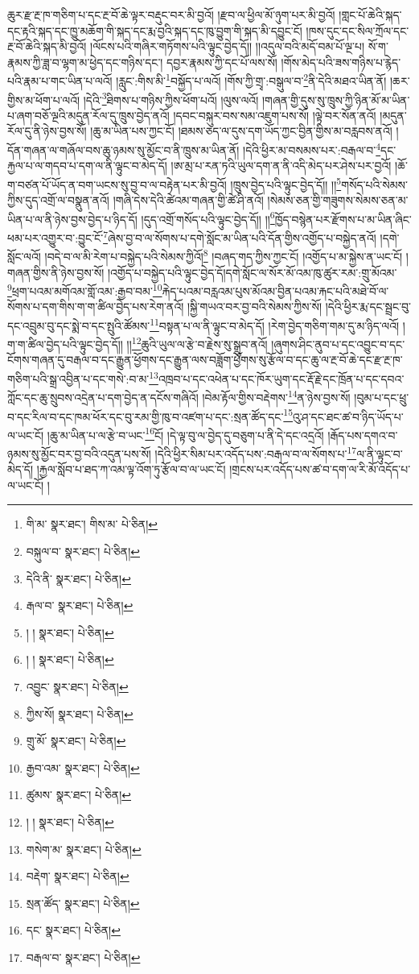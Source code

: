 ཆུར་རྫ་རྔ་ཁ་གཅིག་པ་དང་རྔ་བོ་ཆེ་ལྟར་བརྡུང་བར་མི་བྱའོ། །རྫབ་ལ་ཕྱིལ་མོ་ཉུག་པར་མི་བྱའོ། །གླང་པོ་ཆེའི་སྐད་དང་རྟའི་སྐད་དང་ཁྱུ་མཆོག་གི་སྐད་དང་རྨ་བྱའི་སྐད་དང་ཁུ་བྱུག་གི་སྐད་མི་དབྱུང་ངོ། །ཁས་དུང་དང་སིལ་ཀྲོལ་དང་རྔ་བོ་ཆེའི་སྐད་མི་བྱའོ། །ལོངས་པའི་གཞིར་གཏོགས་པའི་ལྟུང་བྱེད་དོ།། །།འདུལ་བའི་མདོ་བམ་པོ་ལྔ་པ། སོ་ག་རྣམས་ཀྱི་ཟླ་བ་ལྷག་མ་ཕྱེད་དང་གཉིས་དང་། དབྱར་རྣམས་ཀྱི་དང་པོ་ལས་སོ། །གོས་མེད་པའི་ཟས་གཉིས་པ་རྙེད་པའི་རྣམ་པ་གང་ཡིན་པ་ལའོ། །རླུང་:གིས་མི་\footnote{གི་མ་  སྣར་ཐང་། གིས་མ་  པེ་ཅིན། }བསྐྱོད་པ་ལའོ། །གོས་ཀྱི་གྲྭ་:བསྒུལ་བ་\footnote{བསྐུལ་བ་  སྣར་ཐང་།  པེ་ཅིན། }ནི་དེའི་མཐའ་ཡིན་ནོ། །ཆར་གྱིས་མ་ཕོག་པ་ལའོ། །དེའི་\footnote{དེའི་ནི་  སྣར་ཐང་།  པེ་ཅིན། }ཐིགས་པ་གཉིས་ཀྱིས་ཕོག་པའོ། །ལུས་ལའོ། །གཞན་གྱི་དུས་སུ་ཁྲུས་ཀྱི་ཉིན་མོ་མ་ཡིན་པ་ཞག་བཅོ་ལྔའི་མདུན་རོལ་དུ་ཁྲུས་བྱེད་ནའོ། །དབང་བསྐུར་བས་སམ་འཇུག་པས་སོ། །ལྟེ་བར་སོན་ནའོ། །མདུན་རོལ་དུ་ནི་ཉེས་བྱས་སོ། །ཆུ་མ་ཡིན་པས་ཀྱང་ངོ། །ཐམས་ཅད་ལ་དུས་དག་ཡོད་ཀྱང་བྱིན་གྱིས་མ་བརླབས་ནའོ། །དོན་གཞན་ལ་གཞོལ་བས་ཆུ་ཉམས་སུ་མྱོང་བ་ནི་ཁྲུས་མ་ཡིན་ནོ། །དེའི་ཕྱིར་མ་བསམས་པར་:བརྒལ་བ་\footnote{རྒལ་བ་  སྣར་ཐང་།  པེ་ཅིན། }དང་རྐྱལ་པ་ལ་གདབ་པ་དག་ལ་ནི་ལྟུང་བ་མེད་དོ། །ཨ་མྲ་པ་རན་ཏའི་ཡུལ་དག་ན་ནི་འདི་མེད་པར་ཤེས་པར་བྱའོ། །ཆོ་ག་བཙན་པོ་ཡོད་ན་བག་ཡངས་སུ་བྱ་བ་ལ་བརྟེན་པར་མི་བྱའོ། །ཁྲུས་བྱེད་པའི་ལྟུང་བྱེད་དོ།། །།\footnote{། །  སྣར་ཐང་།  པེ་ཅིན། }གསོད་པའི་སེམས་ཀྱིས་དུད་འགྲོ་ལ་བསྣུན་ནའོ། །གཞི་དེས་དེའི་ཚེའམ་གཞན་གྱི་ཚེ་ཤི་ནའོ། །སེམས་ཅན་གྱི་གཟུགས་སེམས་ཅན་མ་ཡིན་པ་ལ་ནི་ཉེས་བྱས་བྱེད་པ་ཉིད་དོ། །དུད་འགྲོ་གསོད་པའི་ལྟུང་བྱེད་དོ།། །།\footnote{། །  སྣར་ཐང་།  པེ་ཅིན། }ཁྱོད་བསྙེན་པར་རྫོགས་པ་མ་ཡིན་ཞིང་ཕམ་པར་འགྱུར་བ་:བྱུང་ངོ་\footnote{འབྱུང་  སྣར་ཐང་།  པེ་ཅིན། }ཞེས་བྱ་བ་ལ་སོགས་པ་དགེ་སློང་མ་ཡིན་པའི་དོན་གྱིས་འགྱོད་པ་བསྐྱེད་ནའོ། །དགེ་སློང་ལའོ། །བདེ་བ་ལ་མི་རེག་པ་བསྐྱེད་པའི་སེམས་ཀྱིའོ།\footnote{ཀྱིས་སོ།  སྣར་ཐང་།  པེ་ཅིན། } །བཞད་གད་ཀྱིས་ཀྱང་ངོ། །འགྱོད་པ་མ་སྐྱེས་ན་ཡང་ངོ། །གཞན་གྱིས་ནི་ཉེས་བྱས་སོ། །འགྱོད་པ་བསྐྱེད་པའི་ལྟུང་བྱེད་དོ།དགེ་སློང་ལ་སོར་མོ་འམ་ཁུ་ཚུར་རམ་:གྲུ་མོའམ་\footnote{གྲུ་མོ་  སྣར་ཐང་།  པེ་ཅིན། }ཕྲག་པའམ་མགོའམ་གློ་འམ་:རྒྱབ་བམ་\footnote{རྒྱབ་འམ་  སྣར་ཐང་།  པེ་ཅིན། }རྐེད་པའམ་བརླའམ་པུས་མོའམ་བྱིན་པའམ་རྐང་པའི་མཐེ་བོ་ལ་སོགས་པ་དག་གིས་ག་ག་ཚིལ་བྱེད་པས་རེག་ནའོ། །སྐྱི་གཡའ་བར་བྱ་བའི་སེམས་ཀྱིས་སོ། །དེའི་ཕྱིར་རྨ་དང་སྦྲང་བུ་དང་འབྲུམ་བུ་དང་སྨེ་བ་དང་སྤུའི་ཚོམས་\footnote{ཚུམས་  སྣར་ཐང་།  པེ་ཅིན། }བསྟན་པ་ལ་ནི་ལྟུང་བ་མེད་དོ། །རེག་བྱེད་གཅིག་གམ་དུ་མ་ཉིད་ལའོ། །ག་ག་ཚིལ་བྱེད་པའི་ལྟུང་བྱེད་དོ།། །།\footnote{། །  སྣར་ཐང་།  པེ་ཅིན། }ཆུའི་ཡུལ་ལ་རྩེ་བ་རྗེས་སུ་སྒྲུབ་ནའོ། །ཞུགས་ཤིང་ནུབ་པ་དང་འབྱུང་བ་དང་ངོགས་གཞན་དུ་བརྒལ་བ་དང་རྒྱུན་ཕྱོགས་དང་རྒྱུན་ལས་བཟློག་ཕྱོགས་སུ་རྩོལ་བ་དང་ཆུ་ལ་རྔ་བོ་ཆེ་དང་རྫ་རྔ་ཁ་གཅིག་པའི་སྒྲ་འབྱིན་པ་དང་གསེ་:བ་མ་\footnote{གསེག་མ་  སྣར་ཐང་།  པེ་ཅིན། }འཁྲབ་པ་དང་འཕེན་པ་དང་ཁོར་ཡུག་དང་རྡོ་རྗེ་དང་ཁྲོན་པ་དང་དབའ་ཀློང་དང་ཆུ་སྲུབས་འདྲེན་པ་དག་བྱེད་ན་དངོས་གཞིའོ། །བེམ་རྟོལ་གྱིས་བརྡེགས་\footnote{བརྡེག་  སྣར་ཐང་།  པེ་ཅིན། }ན་ཉེས་བྱས་སོ། །བུམ་པ་དང་ཕྲུ་བ་དང་རིལ་བ་དང་ཁམ་ཕོར་དང་བུ་རམ་གྱི་ཁུ་བ་འཛག་པ་དང་:སྲན་ཚོད་དང་\footnote{སྲན་ཚོད་  སྣར་ཐང་།  པེ་ཅིན། }འུ་ཤ་དང་ཐང་ཚ་བ་ཉིད་ཡོད་པ་ལ་ཡང་ངོ། །ཆུ་མ་ཡིན་པ་ལ་རྩེ་བ་ཡང་\footnote{དང་  སྣར་ཐང་།  པེ་ཅིན། }ངོ། །དེ་ལྟ་བུ་ལ་བྱེད་དུ་བཅུག་པ་ནི་དེ་དང་འདྲའོ། །རྒོད་པས་དགའ་བ་ཉམས་སུ་མྱོང་བར་བྱ་བའི་འདུན་པས་སོ། །དེའི་ཕྱིར་སིམ་པར་འདོད་པས་:བརྒལ་བ་ལ་སོགས་པ་\footnote{བརྒལ་བ་  སྣར་ཐང་།  པེ་ཅིན། }ལ་ནི་ལྟུང་བ་མེད་དོ། །རྐྱལ་སློབ་པ་ཐད་ཀ་འམ་ལྟ་འོག་ཏུ་རྩོལ་བ་ལ་ཡང་ངོ། །གྲངས་པར་འདོད་པས་ཚ་བ་དག་ལ་རི་མོ་འདོད་པ་ལ་ཡང་ངོ། །
